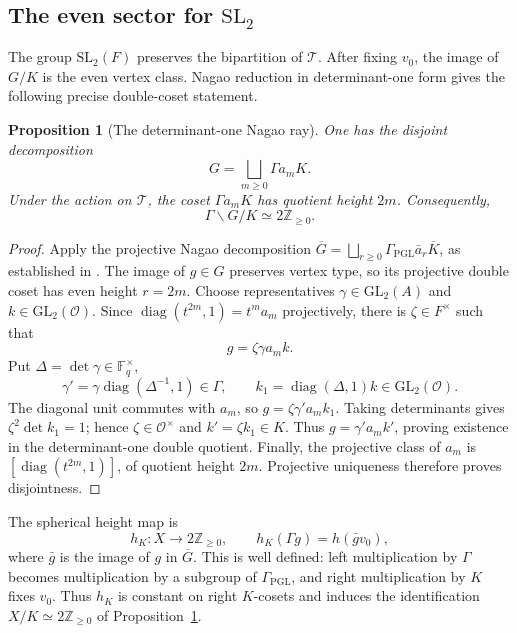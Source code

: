 \documentclass[11pt]{amsart}
\theoremstyle{definition}
\theoremstyle{plain}
\newtheorem{proposition}[definition]{Proposition}
\newcommand{\Fq}{\mathbb F_q}
\newcommand{\cO}{\mathcal O}
\newcommand{\bG}{\overline G}
\newcommand{\GammaP}{\Gamma_{\mathrm{PGL}}}
\newcommand{\bK}{\overline K}
\newcommand{\Tree}{\mathcal T}
\newcommand{\ZZ}{\mathbb Z}
\begin{document}
\subsection{The even sector for
\texorpdfstring{\(\mathrm{SL}_2\)}{SL2}}
The group \(\mathrm{SL}_2(F)\) preserves the bipartition of \(\Tree\).  After
fixing \(v_0\), the image of \(G/K\) is the even vertex class.  Nagao reduction
in determinant-one form gives the following precise double-coset statement.

\begin{proposition}[The determinant-one Nagao ray]
\label{prop:sl-nagao}
One has the disjoint decomposition
\[
G=\bigsqcup_{m\ge0}\Gamma a_mK.
\]
Under the action on \(\Tree\), the coset \(\Gamma a_mK\) has quotient height
\(2m\).  Consequently,
\[
\Gamma\backslash G/K\simeq 2\ZZ_{\ge0}.
\]
\end{proposition}

\begin{proof}
Apply the projective Nagao decomposition
\(\bG=\bigsqcup_{r\ge0}\GammaP\bar a_r\bK\), as established in
\cite{Nagao1959,SerreTrees,Kwon2020}.  The image of \(g\in G\) preserves vertex
type, so its projective double coset has even height \(r=2m\).  Choose
representatives \(\gamma\in\mathrm{GL}_2(A)\) and
\(k\in\mathrm{GL}_2(\cO)\).  Since
\(\operatorname{diag}(t^{2m},1)=t^ma_m\) projectively, there is
\(\zeta\in F^\times\) such that
\[
g=\zeta\gamma a_mk.
\]
Put \(\Delta=\det\gamma\in\Fq^\times\),
\[
\gamma'=\gamma\operatorname{diag}(\Delta^{-1},1)\in\Gamma,
\qquad
k_1=\operatorname{diag}(\Delta,1)k\in\mathrm{GL}_2(\cO).
\]
The diagonal unit commutes with \(a_m\), so \(g=\zeta\gamma'a_mk_1\).
Taking determinants gives \(\zeta^2\det k_1=1\); hence
\(\zeta\in\cO^\times\) and
\(k'=\zeta k_1\in K\).  Thus \(g=\gamma'a_mk'\), proving existence in the
determinant-one double quotient.  Finally, the projective class of \(a_m\) is
\([\operatorname{diag}(t^{2m},1)]\), of quotient height \(2m\).  Projective
uniqueness therefore proves disjointness.
\end{proof}

The spherical height map is
\[
h_K:X\longrightarrow2\ZZ_{\ge0},
\qquad
h_K(\Gamma g)=h(\bar g v_0),
\]
where \(\bar g\) is the image of \(g\) in \(\bG\).  This is well defined:
left multiplication by \(\Gamma\) becomes multiplication by a subgroup of
\(\GammaP\), and right multiplication by \(K\) fixes \(v_0\).  Thus \(h_K\)
is constant on right \(K\)-cosets and induces the identification
\(X/K\simeq2\ZZ_{\ge0}\) of Proposition~\ref{prop:sl-nagao}.
\end{document}
